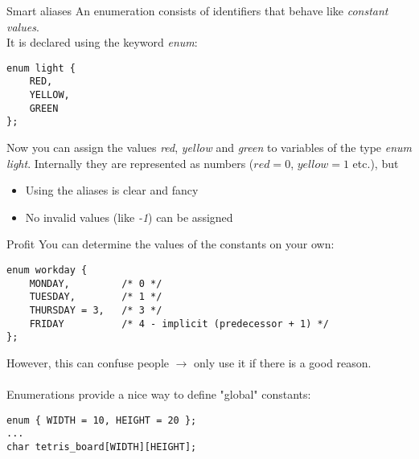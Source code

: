 \begin{frame}[fragile]{Smart aliases}
	An enumeration consists of identifiers that behave like \textit{constant values}. \\
	It is declared using the keyword \textit{enum}:
	\begin{lstlisting}[numbers=none]
enum light {
	RED,
	YELLOW,
	GREEN
};
    \end{lstlisting}
	Now you can assign the values \textit{red}, \textit{yellow} and \textit{green} to variables of the type \textit{enum light}. Internally they are represented as numbers ($red = 0$, $yellow = 1$ etc.), but
	\begin{itemize}
		\item Using the aliases is clear and fancy
		\item No invalid values (like \textit{-1}) can be assigned
	\end{itemize}
\end{frame}


\begin{frame}[fragile]{Profit}
	You can determine the values of the constants on your own:
	\begin{lstlisting}[numbers=none]
enum workday {
	MONDAY,			/* 0 */
	TUESDAY,		/* 1 */
	THURSDAY = 3,	/* 3 */
	FRIDAY			/* 4 - implicit (predecessor + 1) */
};
\end{lstlisting}
	However, this can confuse people $\rightarrow$ only use it if there is a good reason. \\ \ \\
	Enumerations provide a nice way to define "global" constants:
	\begin{lstlisting}[numbers=none]
enum { WIDTH = 10, HEIGHT = 20 };
...
char tetris_board[WIDTH][HEIGHT];
\end{lstlisting}
\end{frame}

